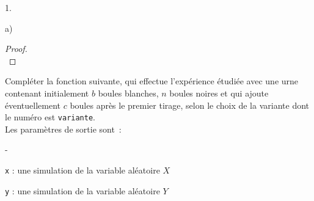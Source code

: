 \documentclass[11pt]{article}%
\begin{document}
\begin{noliste}{1.}
\begin{noliste}{a)}
\begin{proof}
      
      ~\\[-1.4cm]
    \end{proof}




  \item Compléter la fonction suivante, qui effectue l'expérience
    étudiée avec une urne contenant initialement $b$ boules blanches,
    $n$ boules noires et qui ajoute éventuellement $c$ boules après le
    premier tirage,
    selon le choix de la variante dont le numéro est \texttt{variante}.\\
    Les paramètres de sortie sont~:
    \begin{noliste}{-}
    \item \texttt{x} : une simulation de la variable aléatoire $X$
    \item \texttt{y} : une simulation de la variable aléatoire $Y$
    \end{noliste}


\end{noliste}
\end{noliste}
\end{document}

